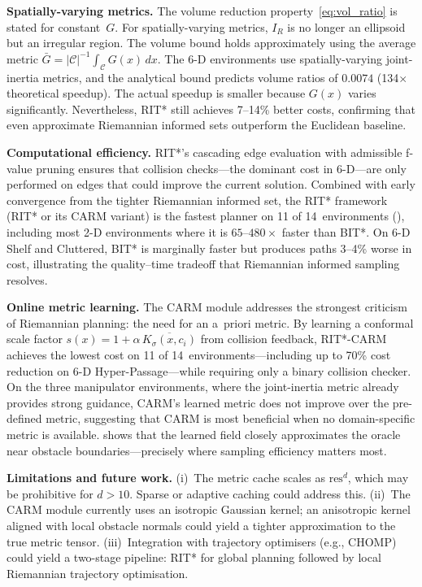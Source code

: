 \documentclass[journal]{IEEEtran}
\newcommand{\Cspace}{\mathcal{C}}
\newcommand{\IR}{I_{\!R}}
\begin{document}
\textbf{Spatially-varying metrics.}
The volume reduction property~\eqref{eq:vol_ratio} is stated for
constant~$G$.
For spatially-varying metrics, $\IR$ is no longer an ellipsoid but an
irregular region. The volume bound holds approximately using the
average metric
$\bar{G} = |\Cspace|^{-1}\int_\Cspace G(x)\, dx$. The 6-D
environments use spatially-varying joint-inertia metrics, and
the analytical bound predicts volume ratios of $0.0074$ (134$\times$
theoretical speedup). The actual speedup is smaller because $G(x)$
varies significantly. Nevertheless, RIT* still achieves 7--14\%
better costs, confirming that even approximate Riemannian informed
sets outperform the Euclidean baseline.

\textbf{Computational efficiency.}
RIT*'s cascading edge evaluation with admissible f-value pruning
ensures that collision checks---the dominant cost in 6-D---are only
performed on edges that could improve the current solution. Combined
with early convergence from the tighter Riemannian informed set, the
RIT* framework (RIT* or its CARM variant) is the fastest planner on
11 of 14~environments (), including most 2-D
environments where it is $65$--$480\times$ faster than BIT*. On 6-D
Shelf and Cluttered, BIT* is marginally faster but produces paths
3--4\% worse in cost, illustrating the quality--time tradeoff that
Riemannian informed sampling resolves.

\textbf{Online metric learning.}
The CARM module addresses the strongest criticism of Riemannian
planning: the need for an a~priori metric. By learning a conformal
scale factor $s(x) = 1 + \alpha\,\overline{K_\sigma(x, c_i)}$ from
collision feedback, RIT*-CARM achieves the lowest cost on 11 of
14~environments---including up to 70\% cost reduction on 6-D
Hyper-Passage---while requiring only a binary collision checker.
On the three manipulator environments, where the joint-inertia metric
already provides strong guidance, CARM's learned metric does not
improve over the pre-defined metric, suggesting that CARM is most
beneficial when no domain-specific metric is available.
 shows that the learned field closely
approximates the oracle near obstacle boundaries---precisely where
sampling efficiency matters most.

\textbf{Limitations and future work.}
(i)~The metric cache scales as $\mathrm{res}^d$, which may be
prohibitive for $d > 10$. Sparse or adaptive caching could address
this.
(ii)~The CARM module currently uses an isotropic Gaussian kernel; an
anisotropic kernel aligned with local obstacle normals could yield a
tighter approximation to the true metric tensor.
(iii)~Integration with trajectory optimisers (e.g., CHOMP) could
yield a two-stage pipeline: RIT* for global planning followed by
local Riemannian trajectory optimisation.
\end{document}
